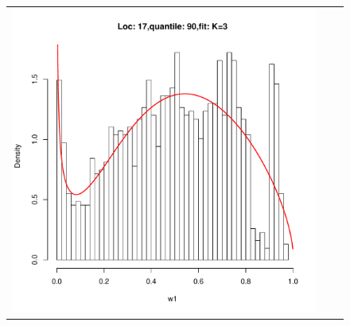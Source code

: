 \documentclass[10pt]{report}
\begin{document}
\begin{figure}[h]
\begin{tabular}{ccc}
\includegraphics[width=\textwidth/3]{../img/loc17/quantile90/fit_K3.pdf}\\



\end{tabular}
\end{figure}
\end{document}
